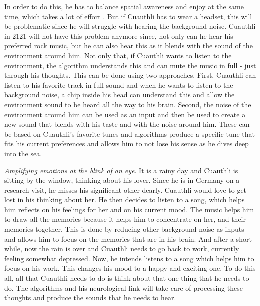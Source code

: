 \documentclass[sigchi]{acmart}
\begin{document}
In order to do this, he has to balance spatial awareness and enjoy at the same time, which takes a lot of effort \cite{fuchs2018dancing}. But if Cuauthli has to wear a headset, this will be problematic since he will struggle with hearing the background noise. Cuauthli in 2121 will not have this problem anymore since, not only can he hear his preferred rock music, but he can also hear this as it blends with the sound of the environment around him. Not only that, if Cuauthli wants to listen to the environment, the algorithm understands this and can mute the music in full - just through his thoughts. This can be done using two approaches. First, Cuauthli can listen to his favorite track in full sound and when he wants to listen to the background noise, a chip inside his head can understand this and allow the environment sound to be heard all the way to his brain. Second, the noise of the environment around him can be used as an input and then be used to create a new sound that blends with his taste and with the noise around him. These can be based on Cuauthli's favorite tunes and algorithms produce a specific tune that fits his current preferences and allows him to not lose his sense as he dives deep into the sea. 

\textit{Amplifying emotions at the blink of an eye}. It is a rainy day and Cuauthli is sitting by the window, thinking about his lover. Since he is in Germany on a research visit, he misses his significant other dearly. Cuauthli would love to get lost in his thinking about her. He then decides to listen to a song, which helps him reflects on his feelings for her and on his current mood. The music helps him to draw all the memories because it helps him to concentrate on her, and their memories together. This is done by reducing other background noise as inputs and allows him to focus on the memories that are in his brain. And after a short while, now the rain is over and Cuauthli needs to go back to work, currently feeling somewhat depressed. Now, he intends listens to a song which helps him to focus on his work. This changes his mood to a happy and exciting one. To do this all, all that Cuauthli needs to do is think about that one thing that he needs to do. The algorithms and his neurological link will take care of processing these thoughts and produce the sounds that he needs to hear. 
\end{document}
